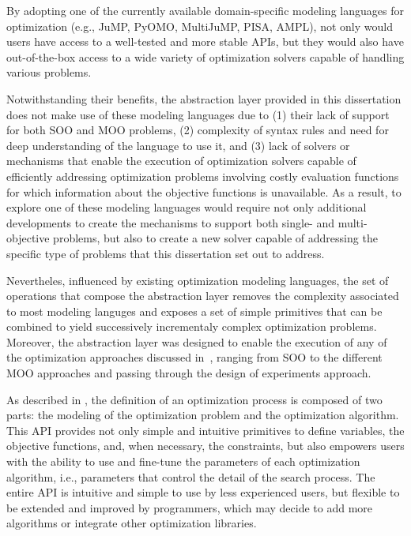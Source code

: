 By adopting one of the currently available domain-specific modeling languages for optimization (e.g., JuMP, PyOMO, MultiJuMP, PISA, AMPL), not only would users have access to a well-tested and more stable \acp{API}, but they would also have out-of-the-box access to a wide variety of optimization solvers capable of handling various problems. 

Notwithstanding their benefits, the abstraction layer provided in this dissertation does not make use of these modeling languages due to (1) their lack of support for both \ac{SOO} and \ac{MOO} problems, (2) complexity of syntax rules and need for deep understanding of the language to use it, and (3) lack of solvers or mechanisms that enable the execution of optimization solvers capable of efficiently addressing optimization problems involving costly evaluation functions for which information about the objective functions is unavailable. As a result, to explore one of these modeling languages would require not only additional developments to create the mechanisms to support both single- and multi-objective problems, but also to create a new solver capable of addressing the specific type of problems that this dissertation set out to address. 

Nevertheles, influenced by existing optimization modeling languages, the set of operations that compose the abstraction layer removes the complexity associated to most modeling languges and exposes a set of simple primitives that can be combined to yield successively incrementaly complex optimization problems. Moreover, the abstraction layer was designed to enable the execution of any of the optimization approaches discussed in~, ranging from \ac{SOO} to the different \ac{MOO} approaches and passing through the design of experiments approach. 

As described in , the definition of an optimization process is composed of two parts: the modeling of the optimization problem and the optimization algorithm. This \ac{API} provides not only simple and intuitive primitives to define variables, the objective functions, and, when necessary, the constraints, but also empowers users with the ability to use and fine-tune the parameters of each optimization algorithm, i.e., parameters that control the detail of the search process. The entire \ac{API} is intuitive and simple to use by less experienced users, but flexible to be extended and improved by programmers, which may decide to add more algorithms or integrate other optimization libraries.

